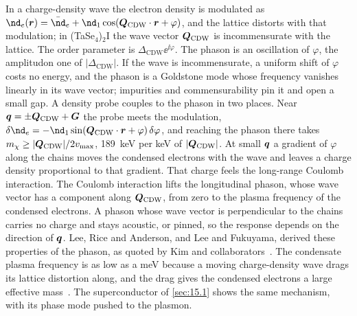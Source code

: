 In a charge-density wave the electron density is modulated as $\nd_e(\vect{r}) = \bar\nd_e + \nd_1\cos(\vect{Q}_{\mathrm{CDW}}\cdot\vect{r} + \varphi)$, and the lattice distorts with that modulation; in (TaSe$_4$)$_2$I the wave vector $\bm{Q}_{\mathrm{CDW}}$ is incommensurate with the lattice. The order parameter is $\Delta_{\mathrm{CDW}}\ee^{\ii\varphi}$. The phason is an oscillation of $\varphi$, the amplitudon one of $|\Delta_{\mathrm{CDW}}|$. If the wave is incommensurate, a uniform shift of $\varphi$ costs no energy, and the phason is a Goldstone mode whose frequency vanishes linearly in its wave vector; impurities and commensurability pin it and open a small gap. A density probe couples to the phason in two places. Near $\bm{q} = \pm\bm{Q}_{\mathrm{CDW}} + \bm{G}$ the probe meets the modulation, $\delta\nd_e = -\nd_1\sin(\vect{Q}_{\mathrm{CDW}}\cdot\vect{r} + \varphi)\,\delta\varphi$, and reaching the phason there takes $m_{\chi} \ge |\bm{Q}_{\mathrm{CDW}}|/2v_{\mathrm{max}}$, \SI{189}{keV} per keV of $|\bm{Q}_{\mathrm{CDW}}|$. At small $\bm{q}$ a gradient of $\varphi$ along the chains moves the condensed electrons with the wave and leaves a charge density proportional to that gradient. That charge feels the long-range Coulomb interaction. The Coulomb interaction lifts the longitudinal phason, whose wave vector has a component along $\bm{Q}_{\mathrm{CDW}}$, from zero to the plasma frequency of the condensed electrons. A phason whose wave vector is perpendicular to the chains carries no charge and stays acoustic, or pinned, so the response depends on the direction of $\bm{q}$. Lee, Rice and Anderson, and Lee and Fukuyama, derived these properties of the phason, as quoted by Kim and collaborators~\cite{kim2023observation}. The condensate plasma frequency is as low as a meV because a moving charge-density wave drags its lattice distortion along, and the drag gives the condensed electrons a large effective mass~\cite{lee1974conductivity}. The superconductor of \cref{sec:15.1} shows the same mechanism, with its phase mode pushed to the plasmon.

